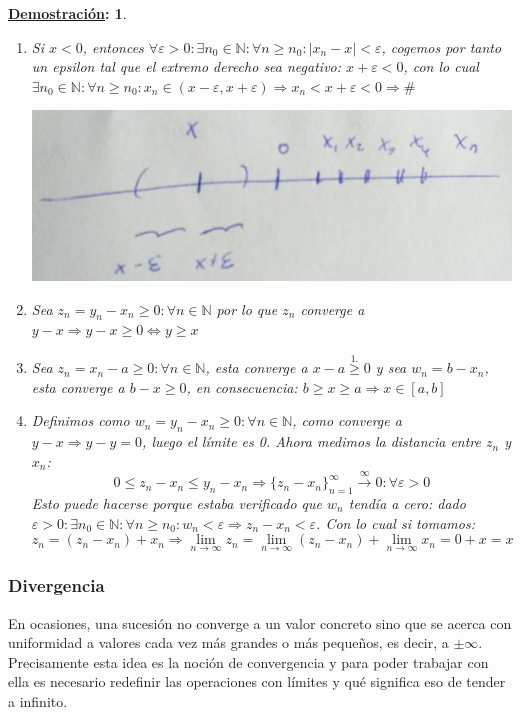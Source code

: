 \documentclass[10pt,a4paper,openright]{book}
\theoremstyle{break}
\newtheorem*{demo}{\underline{Demostración}:}
\begin{document}
\begin{demo}
\begin{enumerate}
\item Si $x<0$, entonces $\forall \varepsilon >0: \exists n_0\in \mathbb N: \forall n\geq n_0: |x_n-x|<\varepsilon$, cogemos por tanto un epsilon tal que el extremo derecho sea negativo: $x+\varepsilon<0$, con lo cual $\exists n_0\in \mathbb N: \forall n \geq n_0: x_n\in (x-\varepsilon,x+\varepsilon)\Rightarrow x_n<x+\varepsilon<0\Rightarrow \#$

\begin{center}
\includegraphics[scale=0.25]{limite negativo}
\end{center}

\item Sea $z_n=y_n-x_n\geq 0: \forall n\in \mathbb N$ por lo que $z_n$ converge a $y-x\Rightarrow y-x\geq 0\Leftrightarrow y\geq x$

\item Sea $z_n=x_n-a\geq 0: \forall n \in \mathbb N$, esta converge a $x-a\stackrel{1.}{\geq}0$ y sea $w_n=b-x_n$, esta converge a $b-x\geq 0$, en consecuencia: $b\geq x\geq a\Rightarrow x\in [a,b]$

\item Definimos como $w_n=y_n-x_n\geq 0: \forall n \in \mathbb N$, como converge a $y-x\Rightarrow y-y=0$, luego el límite es 0. Ahora medimos la distancia entre $z_n$ y $x_n$:
$$0\leq z_n-x_n\leq y_n-x_n\Rightarrow \{z_n-x_n\}_{n=1}^\infty\stackrel{\infty}{\rightarrow} 0: \forall \varepsilon>0$$
Esto puede hacerse porque estaba verificado que $w_n$ tendía a cero: dado $\varepsilon>0: \exists n_0\in \mathbb N: \forall n\geq n_0: w_n<\varepsilon\Rightarrow z_n-x_n<\varepsilon$. Con lo cual si tomamos:
$$z_n=(z_n-x_n)+x_n\Rightarrow \lim_{n\rightarrow \infty} z_n=\lim_{n\rightarrow \infty} (z_n-x_n)+ \lim_{n\rightarrow \infty} x_n=0+x=x$$
\end{enumerate}
\end{demo}

\subsubsection{Divergencia}
En ocasiones, una sucesión no converge a un valor concreto sino que se acerca con uniformidad a valores cada vez más grandes o más pequeños, es decir, a $\pm\infty$. Precisamente esta idea es la noción de convergencia y para poder trabajar con ella es necesario redefinir las operaciones con límites y qué significa eso de tender a infinito.
\end{document}
